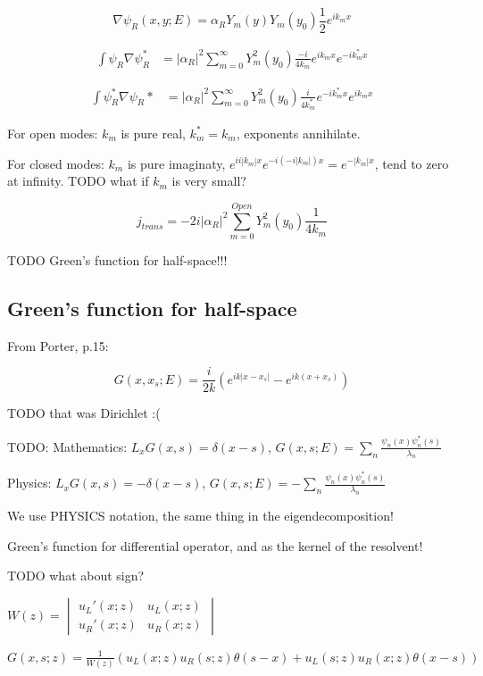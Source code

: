 \documentclass[12pt, a4paper]{article}
\begin{document}
$$\nabla \psi_R(x, y; E) = \alpha_R Y_m(y) Y_m(y_0) \frac{1}{2} e^{i k_m x}$$


\begin{align*}
\int \psi_R \nabla \psi_R^* &= |\alpha_R|^2 \sum\limits_{m = 0}^\infty Y_m^2(y_0) \frac{-i}{4 k_m} e^{i k_m x} e^{-i k_m^* x}
\end{align*}

\begin{align*}
\int \psi^*_R \nabla \psi_R* &= |\alpha_R|^2 \sum\limits_{m = 0}^\infty Y_m^2(y_0) \frac{i}{4 k_m^*} e^{-i k_m^* x} e^{i k_m x}
\end{align*}

For open modes: $k_m$ is pure real, $k_m^* = k_m$, exponents annihilate.

For closed modes: $k_m$ is pure imaginaty, $e^{i i |k_m| x} e^{-i (-i |k_m|) x} = e^{- |k_m| x}$, tend to zero at infinity. TODO what if $k_m$ is very small?

$$j_{trans} = -2i |\alpha_R|^2 \sum\limits_{m = 0}^{Open} Y_m^2(y_0) \frac{1}{4 k_m}$$

TODO Green's function for half-space!!!

\subsection{Green's function for half-space}
From Porter, p.15:

$$G(x, x_s; E) = \frac{i}{2 k} \left( e^{i k |x - x_s|} - e^{i k (x + x_s)} \right)$$

TODO that was Dirichlet :(

TODO:
Mathematics: $L_x G(x, s) = \delta(x - s)$, $G(x, s; E) = \sum\limits_n \frac{\psi_n(x) \psi_n^*(s)}{\lambda_n}$

Physics: $L_x G(x, s) = -\delta(x - s)$, $G(x, s; E) = -\sum\limits_n \frac{\psi_n(x) \psi_n^*(s)}{\lambda_n}$

We use PHYSICS notation, the same thing in the eigendecomposition!

Green's function for differential operator, and as the kernel of the resolvent!

TODO what about sign?

$W(z) = \begin{vmatrix} u_L'(x; z) & u_L(x; z) \\ u_R'(x; z) & u_R(x; z)\end{vmatrix}$

$G(x, s; z) = \frac{1}{W(z)} (u_L(x; z) u_R(s; z) \theta(s - x) + u_L(s; z) u_R(x; z) \theta(x - s))$ 
\end{document}
